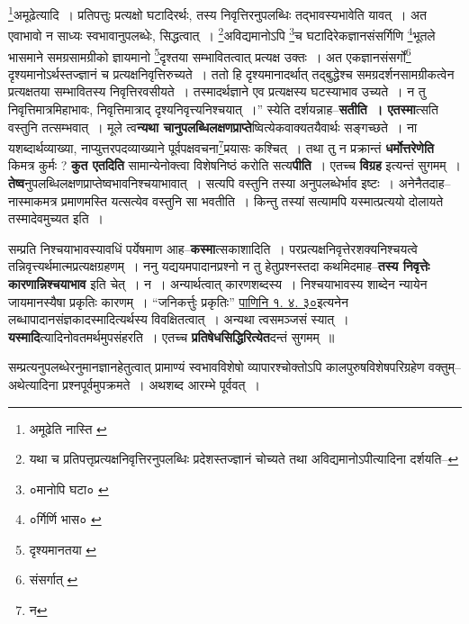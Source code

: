 \documentclass[article,12pt,a4paper]{memoir}
\begin{document}
	\footnote{अमूढेति \cite{dp-msA} \cite{dp-edP} \cite{dp-edE} नास्ति \cite{dp-edH} \cite{dp-edN}}\-अमूढेत्यादि । प्रतिपत्तुः प्रत्यक्षो घटादिरर्थः, तस्य निवृत्तिरनुपलब्धिः तद्भावस्यभावेति यावत् । अत एवाभावो न साध्यः स्वभावानुपलब्धेः, सिद्धत्वात् । \footnote{यथा च प्रतिपत्तृप्रत्यक्षनिवृत्तिरनुपलब्धिः प्रदेशस्तज्ज्ञानं चोच्यते तथा अविद्यमानोऽपीत्यादिना दर्शयति--\cite{dp-msD-n}}\-अविद्यमानोऽपि \footnote{०मानोपि घटा० \cite{dp-msC}}\-च घटादिरेकज्ञानसंसर्गिणि \footnote{०र्गिर्णि भास० \cite{dp-msA} \cite{dp-edE} \cite{dp-edP}}\-भूतले भासमाने समग्रसामग्रीको ज्ञायमानो \footnote{दृश्यमानतया \cite{dp-msB} \cite{dp-msD} \cite{dp-edH} \cite{dp-edN}}\-दृश्तया सम्भावितत्वात् प्रत्यक्ष उक्तः । अत एकज्ञानसंसर्गो\footnote{संसर्गात् \cite{dp-msB}} दृश्यमानोऽर्थस्तज्ज्ञानं च प्रत्यक्षनिवृत्तिरुच्यते । ततो हि दृश्यमानादर्थात् तद्बुद्धेश्च समग्रदर्शनसामग्रीकत्वेन प्रत्यक्षतया सम्भावितस्य निवृत्तिरवसीयते । तस्मादर्थज्ञाने एव प्रत्यक्षस्य घटस्याभाव उच्यते । न तु निवृत्तिमात्रमिहाभावः, निवृत्तिमात्राद् दृश्यनिवृत्त्यनिश्चयात् ।” स्येति दर्शयन्नाह--\textbf{सतीति । एतस्मा}त्सति वस्तुनि तत्सम्भवात् । मूले त्व\textbf{न्यथा चानुपलब्धिलक्षणप्राप्ते}ष्वित्येकवाक्यतयैवार्थः सङ्गच्छते । ना यशब्दार्थव्याख्या, नाप्युत्तरपदव्याख्याने पूर्वपक्षवचना\footnote{न}\-प्रयासः कश्चित् । तथा तु न प्रक्रान्तं \textbf{धर्मोत्तरेणेति} किमत्र कुर्मः ? \textbf{कुत एतदिति} सामान्येनोक्त्वा विशेषनिष्ठं करोति सत्य\textbf{पीति} । एतच्च \textbf{विग्रह} इत्यन्तं सुगमम् । \textbf{तेष्व}नुपलब्धिलक्षणप्राप्तेष्वभावनिश्चयाभावात् । सत्यपि वस्तुनि तस्या अनुपलब्धेर्भाव इष्टः । अनेनैतदाह--नास्माकमत्र प्रमाणमस्ति यत्सत्येव वस्तुनि सा भवतीति । किन्तु तस्यां सत्यामपि यस्मात्प्रत्ययो दोलायते तस्मादेवमुच्यत इति ।
	\pend
      

	  \pstart सम्प्रति निश्चयाभावस्यावधिं पर्येषमाण आह--\textbf{कस्मा}त्सकाशादिति । परप्रत्यक्षनिवृत्तेरशक्यनिश्चयत्वे तन्निवृत्त्यर्थमात्मप्रत्यक्षग्रहणम् । ननु यद्ययमपादानप्रश्नो न तु हेतुप्रश्नस्तदा कथमिदमाह--\textbf{तस्य निवृत्तेः कारणान्निश्चयाभाव} इति चेत् । न । अन्यार्थत्वात् कारणशब्दस्य । निश्चयाभावस्य शाब्देन न्यायेन जायमानस्यैषा प्रकृतिः कारणम् । “जनिकर्त्तुः प्रकृतिः” \href{http://http://sarit.indology.info/?cref=Pā.1.4.30}{पाणिनि १. ४. ३०}इत्यनेन लब्धापादानसंज्ञकादस्मादित्यर्थस्य विवक्षितत्वात् । अन्यथा त्वसमञ्जसं स्यात् । \textbf{यस्मादि}त्यादिनोवतमर्थमुपसंहरति । एतच्च \textbf{प्रतिषेधसिद्धिरित्येत}दन्तं सुगमम् ॥
	\pend
      

	  \pstart सम्प्रत्यनुपलब्धेरनुमानज्ञानहेतुत्वात् प्रामाण्यं स्वभावविशेषो व्यापारश्चोक्तोऽपि कालपुरुषविशेषपरिग्रहेण वक्तुम्--अथेत्यादिना प्रश्नपूर्वमुपक्रमते । अथशब्द आरम्भे पूर्ववत् ।
	\pend
	  \bigskip
	  \begingroup
	
\end{document}
